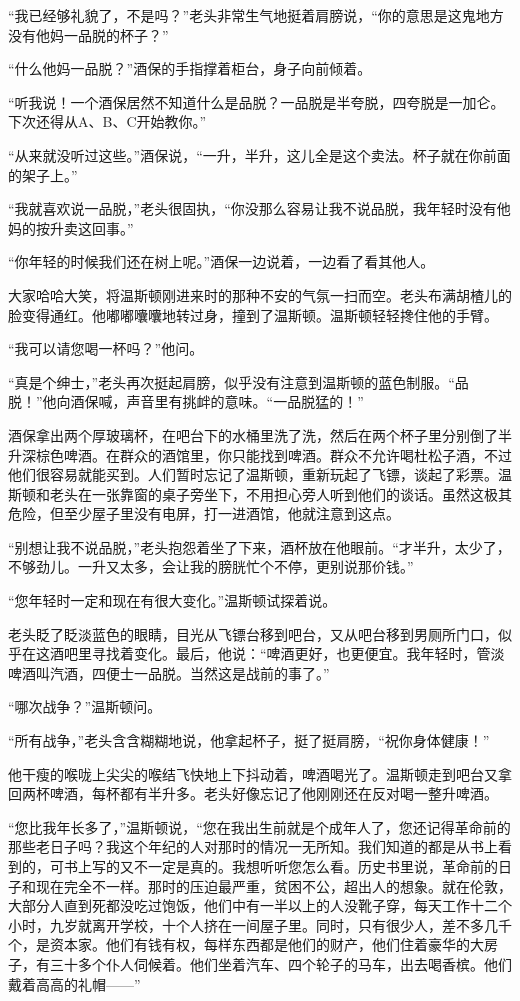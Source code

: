 ``我已经够礼貌了，不是吗？''老头非常生气地挺着肩膀说，``你的意思是这鬼地方没有他妈一品脱的杯子？''

``什么他妈一品脱？''酒保的手指撑着柜台，身子向前倾着。

``听我说！一个酒保居然不知道什么是品脱？一品脱是半夸脱，四夸脱是一加仑。下次还得从A、B、C开始教你。''

``从来就没听过这些。''酒保说，``一升，半升，这儿全是这个卖法。杯子就在你前面的架子上。''

``我就喜欢说一品脱，''老头很固执，``你没那么容易让我不说品脱，我年轻时没有他妈的按升卖这回事。''

``你年轻的时候我们还在树上呢。''酒保一边说着，一边看了看其他人。

大家哈哈大笑，将温斯顿刚进来时的那种不安的气氛一扫而空。老头布满胡楂儿的脸变得通红。他嘟嘟囔囔地转过身，撞到了温斯顿。温斯顿轻轻搀住他的手臂。

``我可以请您喝一杯吗？''他问。

``真是个绅士，''老头再次挺起肩膀，似乎没有注意到温斯顿的蓝色制服。``品脱！''他向酒保喊，声音里有挑衅的意味。``一品脱猛的！''

酒保拿出两个厚玻璃杯，在吧台下的水桶里洗了洗，然后在两个杯子里分别倒了半升深棕色啤酒。在群众的酒馆里，你只能找到啤酒。群众不允许喝杜松子酒，不过他们很容易就能买到。人们暂时忘记了温斯顿，重新玩起了飞镖，谈起了彩票。温斯顿和老头在一张靠窗的桌子旁坐下，不用担心旁人听到他们的谈话。虽然这极其危险，但至少屋子里没有电屏，打一进酒馆，他就注意到这点。

``别想让我不说品脱，''老头抱怨着坐了下来，酒杯放在他眼前。``才半升，太少了，不够劲儿。一升又太多，会让我的膀胱忙个不停，更别说那价钱。''

``您年轻时一定和现在有很大变化。''温斯顿试探着说。

老头眨了眨淡蓝色的眼睛，目光从飞镖台移到吧台，又从吧台移到男厕所门口，似乎在这酒吧里寻找着变化。最后，他说：``啤酒更好，也更便宜。我年轻时，管淡啤酒叫汽酒，四便士一品脱。当然这是战前的事了。''

``哪次战争？''温斯顿问。

``所有战争，''老头含含糊糊地说，他拿起杯子，挺了挺肩膀，``祝你身体健康！''

他干瘦的喉咙上尖尖的喉结飞快地上下抖动着，啤酒喝光了。温斯顿走到吧台又拿回两杯啤酒，每杯都有半升多。老头好像忘记了他刚刚还在反对喝一整升啤酒。

``您比我年长多了，''温斯顿说，``您在我出生前就是个成年人了，您还记得革命前的那些老日子吗？我这个年纪的人对那时的情况一无所知。我们知道的都是从书上看到的，可书上写的又不一定是真的。我想听听您怎么看。历史书里说，革命前的日子和现在完全不一样。那时的压迫最严重，贫困不公，超出人的想象。就在伦敦，大部分人直到死都没吃过饱饭，他们中有一半以上的人没靴子穿，每天工作十二个小时，九岁就离开学校，十个人挤在一间屋子里。同时，只有很少人，差不多几千个，是资本家。他们有钱有权，每样东西都是他们的财产，他们住着豪华的大房子，有三十多个仆人伺候着。他们坐着汽车、四个轮子的马车，出去喝香槟。他们戴着高高的礼帽------''

